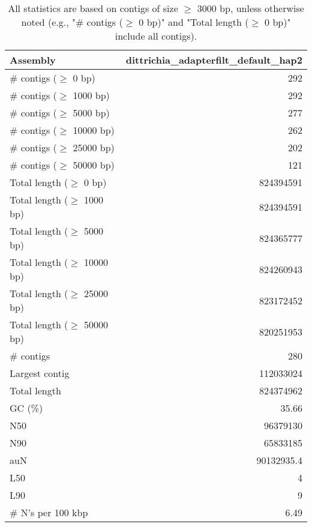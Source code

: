 \documentclass[12pt,a4paper]{article}
\begin{document}
\begin{table}[ht]
\begin{center}
\caption{All statistics are based on contigs of size $\geq$ 3000 bp, unless otherwise noted (e.g., "\# contigs ($\geq$ 0 bp)" and "Total length ($\geq$ 0 bp)" include all contigs).}
\begin{tabular}{|l*{1}{|r}|}
\hline
Assembly & dittrichia\_adapterfilt\_default\_hap2 \\ \hline
\# contigs ($\geq$ 0 bp) & 292 \\ \hline
\# contigs ($\geq$ 1000 bp) & 292 \\ \hline
\# contigs ($\geq$ 5000 bp) & 277 \\ \hline
\# contigs ($\geq$ 10000 bp) & 262 \\ \hline
\# contigs ($\geq$ 25000 bp) & 202 \\ \hline
\# contigs ($\geq$ 50000 bp) & 121 \\ \hline
Total length ($\geq$ 0 bp) & 824394591 \\ \hline
Total length ($\geq$ 1000 bp) & 824394591 \\ \hline
Total length ($\geq$ 5000 bp) & 824365777 \\ \hline
Total length ($\geq$ 10000 bp) & 824260943 \\ \hline
Total length ($\geq$ 25000 bp) & 823172452 \\ \hline
Total length ($\geq$ 50000 bp) & 820251953 \\ \hline
\# contigs & 280 \\ \hline
Largest contig & 112033024 \\ \hline
Total length & 824374962 \\ \hline
GC (\%) & 35.66 \\ \hline
N50 & 96379130 \\ \hline
N90 & 65833185 \\ \hline
auN & 90132935.4 \\ \hline
L50 & 4 \\ \hline
L90 & 9 \\ \hline
\# N's per 100 kbp & 6.49 \\ \hline
\end{tabular}
\end{center}
\end{table}
\end{document}
